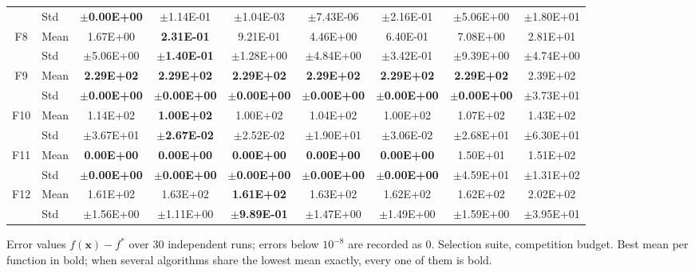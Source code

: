 \begin{table}[htbp]
{\begin{tabular}{clccccccc}
 & Std & $\pm$\textbf{0.00E+00} & $\pm$1.14E-01 & $\pm$1.04E-03 & $\pm$7.43E-06 & $\pm$2.16E-01 & $\pm$5.06E+00 & $\pm$1.80E+01 \\
F8 & Mean & 1.67E+00 & \textbf{2.31E-01} & 9.21E-01 & 4.46E+00 & 6.40E-01 & 7.08E+00 & 2.81E+01 \\
 & Std & $\pm$5.06E+00 & $\pm$\textbf{1.40E-01} & $\pm$1.28E+00 & $\pm$4.84E+00 & $\pm$3.42E-01 & $\pm$9.39E+00 & $\pm$4.74E+00 \\
F9 & Mean & \textbf{2.29E+02} & \textbf{2.29E+02} & \textbf{2.29E+02} & \textbf{2.29E+02} & \textbf{2.29E+02} & \textbf{2.29E+02} & 2.39E+02 \\
 & Std & $\pm$\textbf{0.00E+00} & $\pm$\textbf{0.00E+00} & $\pm$\textbf{0.00E+00} & $\pm$\textbf{0.00E+00} & $\pm$\textbf{0.00E+00} & $\pm$\textbf{0.00E+00} & $\pm$3.73E+01 \\
F10 & Mean & 1.14E+02 & \textbf{1.00E+02} & 1.00E+02 & 1.04E+02 & 1.00E+02 & 1.07E+02 & 1.43E+02 \\
 & Std & $\pm$3.67E+01 & $\pm$\textbf{2.67E-02} & $\pm$2.52E-02 & $\pm$1.90E+01 & $\pm$3.06E-02 & $\pm$2.68E+01 & $\pm$6.30E+01 \\
F11 & Mean & \textbf{0.00E+00} & \textbf{0.00E+00} & \textbf{0.00E+00} & \textbf{0.00E+00} & \textbf{0.00E+00} & 1.50E+01 & 1.51E+02 \\
 & Std & $\pm$\textbf{0.00E+00} & $\pm$\textbf{0.00E+00} & $\pm$\textbf{0.00E+00} & $\pm$\textbf{0.00E+00} & $\pm$\textbf{0.00E+00} & $\pm$4.59E+01 & $\pm$1.31E+02 \\
F12 & Mean & 1.61E+02 & 1.63E+02 & \textbf{1.61E+02} & 1.63E+02 & 1.62E+02 & 1.62E+02 & 2.02E+02 \\
 & Std & $\pm$1.56E+00 & $\pm$1.11E+00 & $\pm$\textbf{9.89E-01} & $\pm$1.47E+00 & $\pm$1.49E+00 & $\pm$1.59E+00 & $\pm$3.95E+01 \\
\bottomrule
\end{tabular}}
\begin{flushleft}\footnotesize
Error values $f(\mathbf{x})-f^{*}$ over 30 independent runs; errors below $10^{-8}$ are recorded as 0. Selection suite, competition budget. Best mean per function in bold; when several algorithms share the lowest mean exactly, every one of them is bold.
\end{flushleft}
\end{table}
